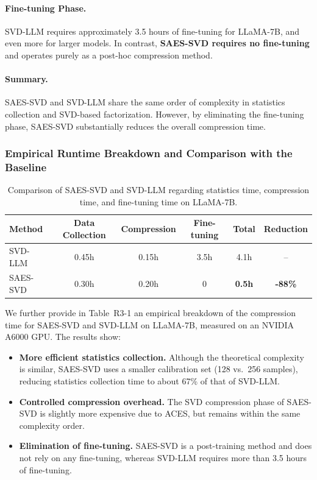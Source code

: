 \paragraph{Fine-tuning Phase.}
SVD-LLM requires approximately 3.5 hours of fine-tuning for LLaMA-7B, and even more for larger models. In contrast, \textbf{SAES-SVD requires no fine-tuning} and operates purely as a post-hoc compression method.

\paragraph{Summary.}
SAES-SVD and SVD-LLM share the same order of complexity in statistics collection and SVD-based factorization. However, by eliminating the fine-tuning phase, SAES-SVD substantially reduces the overall compression time.

\subsubsection{Empirical Runtime Breakdown and Comparison with the Baseline}

\begin{table}[h]
\centering
\caption{{Comparison of SAES-SVD and SVD-LLM regarding statistics time, compression time, and fine-tuning time on LLaMA-7B.}}
\begin{tabular}{lccccc}
\toprule
\textbf{Method} & \textbf{Data Collection} & \textbf{Compression} & \textbf{Fine-tuning} & \textbf{Total} & \textbf{Reduction} \\
\midrule
SVD-LLM  & 0.45h & 0.15h & 3.5h & 4.1h & -- \\
SAES-SVD & 0.30h & 0.20h & 0    & \textbf{0.5h} & \textbf{-88\%} \\
\bottomrule
\end{tabular}
\end{table}

We further provide in Table~R3-1 an empirical breakdown of the compression time for SAES-SVD and SVD-LLM on LLaMA-7B, measured on an NVIDIA A6000 GPU. The results show:

\begin{itemize}
    \item \textbf{More efficient statistics collection.}  
    Although the theoretical complexity is similar, SAES-SVD uses a smaller calibration set (128 vs.\ 256 samples), reducing statistics collection time to about 67\% of that of SVD-LLM.
    \item \textbf{Controlled compression overhead.}  
    The SVD compression phase of SAES-SVD is slightly more expensive due to ACES, but remains within the same complexity order.
    \item \textbf{Elimination of fine-tuning.}  
    SAES-SVD is a post-training method and does not rely on any fine-tuning, whereas SVD-LLM requires more than 3.5 hours of fine-tuning.
\end{itemize}

